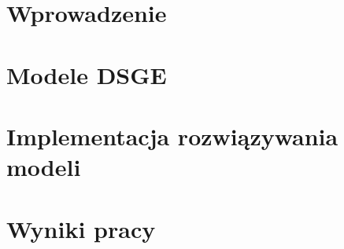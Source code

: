 \documentclass[twoside,a4paper,12pt]{report} %
\begin{document}
\pagebreak

\chapter*{Wprowadzenie}


\chapter{Modele DSGE}


\chapter{Implementacja rozwiązywania modeli}
\label{chapter:implementation}


\chapter{Wyniki pracy}
\label{chapter:results}



\nocite{*}
\end{document}
